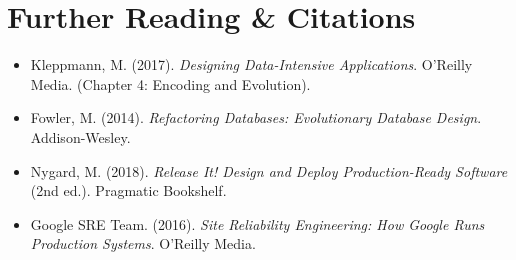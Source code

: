 \section{Further Reading \protect\& Citations}
\begin{itemize}[leftmargin=18pt]
  \item Kleppmann, M. (2017). \textit{Designing Data-Intensive Applications}. O'Reilly Media. (Chapter 4: Encoding and Evolution).
  \item Fowler, M. (2014). \textit{Refactoring Databases: Evolutionary Database Design}. Addison-Wesley.
  \item Nygard, M. (2018). \textit{Release It! Design and Deploy Production-Ready Software} (2nd ed.). Pragmatic Bookshelf.
  \item Google SRE Team. (2016). \textit{Site Reliability Engineering: How Google Runs Production Systems}. O'Reilly Media.
\end{itemize}
